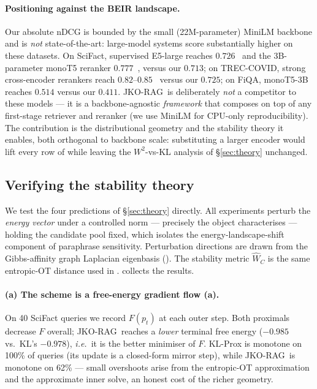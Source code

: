 \documentclass{article}
\theoremstyle{plain}
\newcommand{\mWdist}{\widehat{W}_C}
\newcommand{\jko}{\textsc{JKO-RAG}}
\newcommand{\ie}{\textit{i.e.}}
\begin{document}
\paragraph{Positioning against the BEIR landscape.}
Our absolute nDCG is bounded by the small (22M-parameter) MiniLM backbone and is \emph{not} state-of-the-art: large-model systems score substantially higher on these datasets. On SciFact, supervised E5-large reaches $0.726$~\cite{wang2023e5} and the 3B-parameter monoT5 reranker $0.777$~\cite{rosa2022monot5}, versus our $0.713$; on TREC-COVID, strong cross-encoder rerankers reach $0.82$--$0.85$~\cite{rosa2022monot5} versus our $0.725$; on FiQA, monoT5-3B reaches $0.514$ versus our $0.411$. \jko\ is deliberately \emph{not} a competitor to these models --- it is a backbone-agnostic \emph{framework} that composes on top of any first-stage retriever and reranker (we use MiniLM for CPU-only reproducibility). The contribution is the distributional geometry and the stability theory it enables, both orthogonal to backbone scale: substituting a larger encoder would lift every row of  while leaving the $W^2$-vs-KL analysis of \S\ref{sec:theory} unchanged.

\subsection{Verifying the stability theory}
\label{sec:verify}

We test the four predictions of \S\ref{sec:theory} directly. All experiments perturb the \emph{energy vector} under a controlled norm --- precisely the object  characterises --- holding the candidate pool fixed, which isolates the energy-landscape-shift component of paraphrase sensitivity. Perturbation directions are drawn from the Gibbs-affinity graph Laplacian eigenbasis (). The stability metric $\mWdist$ is the same entropic-OT distance used in .  collects the results.

\paragraph{(a) The scheme is a free-energy gradient flow (a).}
On 40 SciFact queries we record $F(p_t)$ at each outer step. Both proximals decrease $F$ overall; \jko\ reaches a \emph{lower} terminal free energy ($-0.985$ vs.\ KL's $-0.978$), \ie\ it is the better minimiser of $F$. KL-Prox is monotone on 100\% of queries (its update is a closed-form mirror step), while \jko\ is monotone on 62\% --- small overshoots arise from the entropic-OT approximation and the approximate inner solve, an honest cost of the richer geometry.
\end{document}
